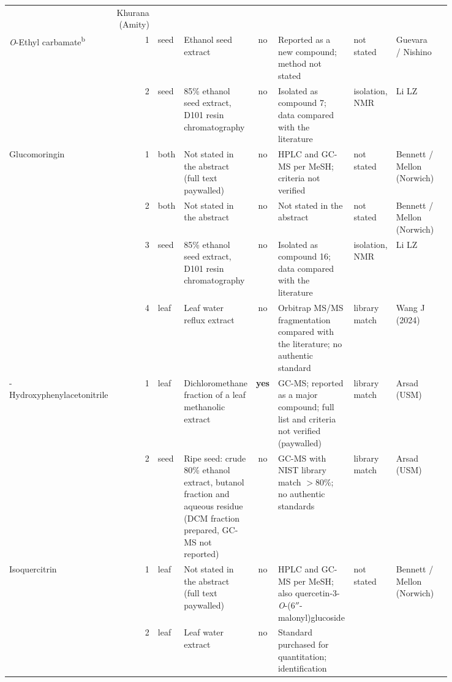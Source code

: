 \begin{landscape}
\begin{longtable}{@{}L{0.11\linewidth} r l L{0.18\linewidth} c L{0.23\linewidth}
    L{0.075\linewidth} L{0.11\linewidth} L{0.13\linewidth}@{}}
    & Khurana (Amity) &  \\
  \addlinespace
  \textit{O}-Ethyl carbamate\textsuperscript{b} & 1 & seed & Ethanol seed extract & no
    & Reported as a new compound; method not stated & not stated & Guevara / Nishino
    &  \\
   & 2 & seed & 85\% ethanol seed extract, D101 resin chromatography & no
    & Isolated as compound 7; data compared with the literature & isolation, NMR & Li LZ
    &  \\
  \addlinespace
  Glucomoringin & 1 & both & Not stated in the abstract (full text paywalled) & no
    & HPLC and GC-MS per MeSH; criteria not verified & not stated & Bennett / Mellon (Norwich)
    &  \\
   & 2 & both & Not stated in the abstract & no & Not stated in the abstract & not stated
    & Bennett / Mellon (Norwich) &  \\
   & 3 & seed & 85\% ethanol seed extract, D101 resin chromatography & no
    & Isolated as compound 16; data compared with the literature & isolation, NMR & Li LZ
    &  \\
   & 4 & leaf & Leaf water reflux extract & no & Orbitrap MS/MS fragmentation compared with
      the literature; no authentic standard & library match & Wang J (2024)
    &  \\
  -Hydroxyphenyl\-acetonitrile & 1 & leaf & Dichloromethane fraction of a leaf methanolic
      extract & \textbf{yes} & GC-MS; reported as a major compound; full list and criteria
      not verified (paywalled) & library match & Arsad (USM)
    &  \\
   & 2 & seed & Ripe seed: crude 80\% ethanol extract, butanol fraction and aqueous residue
      (DCM fraction prepared, GC-MS not reported) & no & GC-MS with NIST library match
      $>80\%$; no authentic standards & library match & Arsad (USM)
    &  \\
  \addlinespace
  Isoquercitrin & 1 & leaf & Not stated in the abstract (full text paywalled) & no
    & HPLC and GC-MS per MeSH; also quercetin-3-\textit{O}-(6$''$-malonyl)glucoside
    & not stated & Bennett / Mellon (Norwich) &  \\
   & 2 & leaf & Leaf water extract & no & Standard purchased for quantitation; identification

\end{longtable}
\end{landscape}
